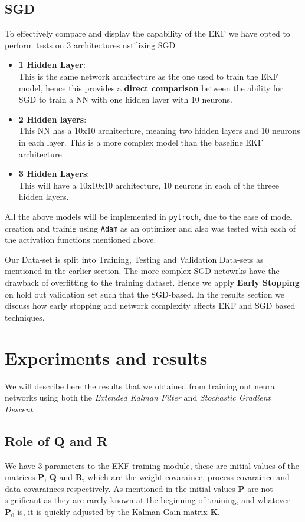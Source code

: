 \documentclass{article}
\begin{document}
\subsection{SGD}
To effectively compare and display the capability of the EKF we have opted to perform tests on 3 architectures ustilizing SGD
\begin{itemize}
    \item \textbf{1 Hidden Layer}:\\
    This is the same network architecture as the one used to train the EKF model, hence this provides a \textbf{direct comparison} between the ability for SGD to train a NN with one hidden layer with  10 neurons.
    \item \textbf{2 Hidden layers}:\\
    This NN has a 10x10 architecture, meaning two hidden layers and 10 neurons in each layer. This is a more complex model than the baseline EKF architecture.
    \item \textbf{3 Hidden Layers}:\\
    This will have a 10x10x10 architecture, 10 neurons in each of the threee hidden layers.
\end{itemize}
All the above models will be implemented in \texttt{pytroch}, due to the ease of model creation and trainig using \texttt{Adam} as an optimizer and also was tested with each of the activation functions mentioned above. 

Our Data-set is split into Training, Testing and Validation Data-sets as mentioned in the earlier section. The more complex SGD netowrks have the drawback of overfitting to the training dataset. Hence we apply \textbf{Early Stopping}
on hold out validation set such that the SGD-based. In the results section we discuss how early stopping and network complexity affects EKF and SGD based techniques.

\clearpage
\section{Experiments and results}
We will describe here the results that we obtained from training out neural networks using both the \textit{Extended Kalman Filter} and \textit{Stochastic Gradient Descent}.

\subsection{Role of \textbf{Q} and \textbf{R} }
We have 3 parameters to the EKF training module, these are initial values of the matrices $\boldsymbol{P}$, $\boldsymbol{Q}$ and $\boldsymbol{R}$, which are the weight covaraince, process covaraince and data covarainces respectively. As mentioned in \cite{Main_EKS_Paper} the initial values $\boldsymbol{P}$ are not significant as they are rarely known at the beginning of training, and whatever $\boldsymbol{P}_0$ is, it is quickly adjusted by the Kalman Gain matrix $\boldsymbol{K}$.
\end{document}
